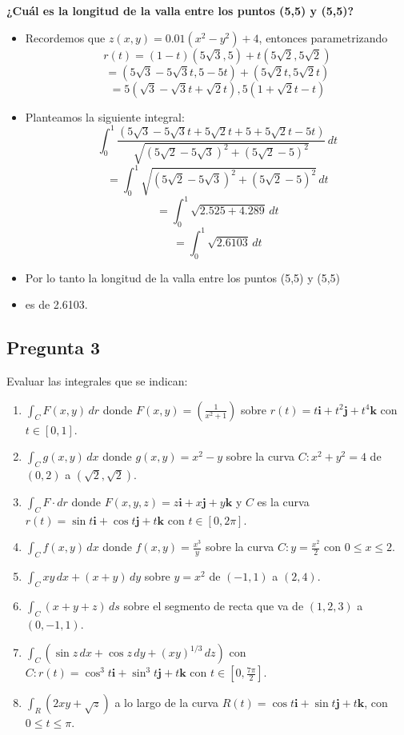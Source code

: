 \documentclass{article}
\begin{document}
    \item \textbf{¿Cuál es la longitud de la valla entre los puntos (5,5) y (5,5)?}
    \begin{itemize}
        \item Recordemos que \(z(x, y) = 0.01(x^2 - y^2) + 4\), entonces parametrizando 
        \[ r(t) = (1-t)(5\sqrt{3},5) + t(5\sqrt{2},5\sqrt{2}) \]
        \[ = (5\sqrt{3} - 5\sqrt{3}t, 5 - 5t) + (5\sqrt{2}t, 5\sqrt{2}t) \]
        \[ = 5 (\sqrt{3} - \sqrt{3}t + \sqrt{2}t), 5(1 + \sqrt{2}t - t) \]
        \item Planteamos la siguiente integral:
        \[ \int_{0}^{1} \frac{(5\sqrt{3} - 5\sqrt{3}t + 5\sqrt{2}t + 5 + 5\sqrt{2}t - 5t)}{\sqrt{(5\sqrt{2} - 5\sqrt{3})^2 + (5\sqrt{2} - 5)^2 }} \, dt \]
        \[ = \int_{0}^{1} \sqrt{(5\sqrt{2} - 5\sqrt{3})^2 + (5\sqrt{2} - 5)^2 } \, dt \]
        \[ = \int_{0}^{1} \sqrt{2.525 + 4.289} \, dt \]
        \[ = \int_{0}^{1} \sqrt{2.6103} \, dt \]
        \item Por lo tanto la longitud de la valla entre los puntos (5,5) y (5,5)
        \item es de 2.6103.
    \end{itemize}

    
    \subsection*{Pregunta 3}
Evaluar las integrales que se indican:
\begin{enumerate}
    \item \( \int_{C} F(x,y) \, dr \) donde \( F(x,y) = \left(\frac{1}{x^2 + 1}\right) \) sobre \( r(t) = t\mathbf{i} + t^2\mathbf{j} + t^4\mathbf{k} \) con \( t \in [0,1] \).
    \item \( \int_{C} g(x,y) \, dx \) donde \( g(x, y) = x^2 - y \) sobre la curva \( C: x^2 + y^2 = 4 \) de \( (0, 2) \) a \( (\sqrt{2}, \sqrt{2}) \).
    \item \( \int_{C} F \cdot dr \) donde \( F(x, y, z) = z\mathbf{i} + x\mathbf{j} + y\mathbf{k} \) y \( C \) es la curva \( r(t) = \sin t \mathbf{i} + \cos t \mathbf{j} + t \mathbf{k} \) con \( t \in [0, 2\pi] \).
    \item \( \int_{C} f(x, y) \, dx \) donde \( f(x, y) = \frac{x^3}{y} \) sobre la curva \( C: y = \frac{x^2}{2} \) con \( 0 \leq x \leq 2 \).
    \item \( \int_{C} xy \, dx + (x + y) \, dy \) sobre \( y = x^2 \) de \( (-1, 1) \) a \( (2, 4) \).
    \item \( \int_{C} (x + y + z) \, ds \) sobre el segmento de recta que va de \( (1, 2, 3) \) a \( (0, -1, 1) \).
    \item \( \int_{C} (\sin z \, dx + \cos z \, dy + (xy)^{1/3} \, dz) \) con \( C: r(t) = \cos^3 t \mathbf{i} + \sin^3 t \mathbf{j} + t \mathbf{k} \) con \( t \in [0, \frac{7\pi}{2}] \).
    \item \( \int_{R} (2xy + \sqrt{z}) \) a lo largo de la curva \( R(t) = \cos t \mathbf{i} + \sin t \mathbf{j} + t \mathbf{k} \), con \( 0 \leq t \leq \pi \).
\end{enumerate}
\end{document}
